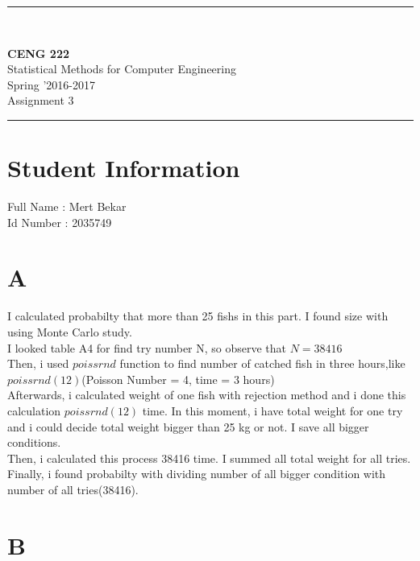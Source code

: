 \documentclass[12pt]{article}
\newcommand{\HRule}{\rule{\linewidth}{1mm}}
\begin{document}
\noindent
\HRule \\[3mm]
\begin{flushright}

                                         \LARGE \textbf{CENG 222}  \\[4mm]
                                         \Large Statistical Methods for Computer Engineering \\[4mm]
                                        \normalsize      Spring '2016-2017 \\
                                           \Large   Assignment 3 \\
					
\end{flushright}
\HRule

\section*{Student Information } 
Full Name : Mert Bekar \\
Id Number : 2035749 \\

\section*{A}

I calculated probabilty that more than 25 fishs in this part. I found size with using Monte Carlo study.\\
I looked table A4 for find try number N, so observe that $N = 38416$\\ 
Then, i used $poissrnd$ function to find number of catched fish in three hours,like $poissrnd(12)$(Poisson Number = 4, time = 3 hours)\\
Afterwards, i calculated weight of one fish with rejection method and i done this calculation $poissrnd(12)$ time. In this moment, i have total weight for one try and i could decide total weight bigger than 25 kg or not. I save all bigger conditions.\\
Then, i calculated this process 38416 time. I summed all total weight for all tries.\\
Finally, i found probabilty with dividing number of all bigger condition with number of all tries(38416).




\section*{B}
\end{document}

